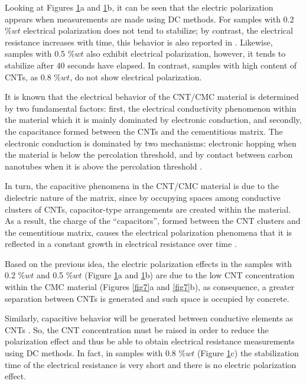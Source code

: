 \documentclass[twocolumn]{bmcart}%
\begin{document}
\begin{figure}[h!]
  \caption{
      }
      \label{fig9}
      \end{figure}


Looking at Figures \ref{fig9}a and \ref{fig9}b, it can be seen that the electric polarization  appears when measurements are made using DC methods. For samples with 0.2 $\%wt$ electrical polarization does not tend to stabilize; by contrast, the electrical resistance increases with time, this behavior is also reported in \cite{Garcia-Macias2017a, Downey2017}. Likewise, samples with 0.5 $\%wt$ also exhibit electrical polarization, however, it tends to stabilize after 40 seconds have elapsed. In contrast, samples with high content of CNTs, as 0.8 $\%wt$, do not show electrical polarization.

It is known that the electrical behavior of the CNT/CMC material is determined by two fundamental factors: first, the electrical conductivity phenomenon within the material which it is mainly dominated by electronic conduction, and secondly, the capacitance formed between the CNTs and the cementitious matrix. The electronic conduction is dominated by two mechanisms: electronic hopping when the material is below the percolation threshold, and by contact between carbon nanotubes when it is above the percolation threshold \cite{Garcia-Macias2017a, Downey2017}. 

In turn, the capacitive phenomena in the CNT/CMC material is due to the dielectric nature of the matrix, since by occupying spaces among conductive clusters of CNTs, capacitor-type arrangements are created within the material. As a result, the charge of the “capacitors”, formed between the CNT clusters and the cementitious matrix, causes the electrical polarization phenomena that it is reflected in a constant growth in electrical resistance over time \cite{Dong2016}.

Based on the previous idea, the electric polarization effects in the samples with 0.2 $\%wt$ and 0.5 $\%wt$ (Figure \ref{fig9}a and \ref{fig9}b) are due to the low CNT concentration within the CMC material (Figures \ref{fig7}a and \ref{fig7}b), as consequence, a greater separation between CNTs is generated and such space is occupied by concrete.  

Similarly, capacitive behavior will be generated between conductive elements as CNTs \cite{Garcia-Macias2017a, Downey2017, Dong2016, Balberg1984}. So, the CNT concentration must be raised in order to reduce the polarization effect and thus be able to obtain electrical resistance measurements using DC methods. In fact, in samples with 0.8 $\%wt$ (Figure \ref{fig9}c) the stabilization time of the electrical resistance is very short and there is no electric polarization effect.
\end{document}
